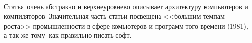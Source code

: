 \subsection{} \label{subsection_Wulf1981}
Статья\,\cite{Wulf1981} очень абстракно и верхнеуровнево описывает архитектуру компьютеров и компиляторов. Значительная часть статьи посвещена <<большим темпам роста>> промышленности в сфере комьютеров и программ того времени (1981), а так же тому, как правильно писать софт.

